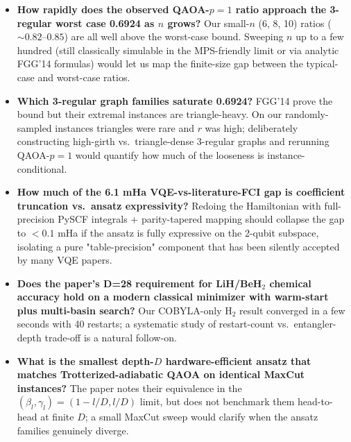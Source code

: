 \documentclass[11pt]{article}
\begin{document}
\begin{itemize}
  \item[\textbf{Q1}] \textbf{How rapidly does the observed QAOA-$p{=}1$ ratio approach the
        3-regular worst case 0.6924 as $n$ grows?}  Our small-$n$ (6, 8, 10)
        ratios ($\sim 0.82$--$0.85$) are all well above the worst-case bound.
        Sweeping $n$ up to a few hundred (still classically simulable in the
        MPS-friendly limit or via analytic FGG'14 formulas) would let us map
        the finite-size gap between the typical-case and worst-case ratios.
  \item[\textbf{Q2}] \textbf{Which 3-regular graph families saturate 0.6924?} FGG'14 prove the
        bound but their extremal instances are triangle-heavy.  On our
        randomly-sampled instances triangles were rare and $r$ was high;
        deliberately constructing high-girth vs.\ triangle-dense 3-regular
        graphs and rerunning QAOA-$p{=}1$ would quantify how much of the
        looseness is instance-conditional.
  \item[\textbf{Q3}] \textbf{How much of the 6.1 mHa VQE-vs-literature-FCI gap is coefficient
        truncation vs.\ ansatz expressivity?} Redoing the Hamiltonian with
        full-precision PySCF integrals + parity-tapered mapping should collapse
        the gap to $< 0.1$ mHa if the ansatz is fully expressive on
        the 2-qubit subspace, isolating a pure "table-precision" component
        that has been silently accepted by many VQE papers.
  \item[\textbf{Q4}] \textbf{Does the paper's D=28 requirement for LiH/BeH$_2$ chemical
        accuracy hold on a modern classical minimizer with warm-start plus
        multi-basin search?} Our COBYLA-only H$_2$ result converged in a few
        seconds with 40 restarts; a systematic study of restart-count vs.\
        entangler-depth trade-off is a natural follow-on.
  \item[\textbf{Q5}] \textbf{What is the smallest depth-$D$ hardware-efficient ansatz that
        matches Trotterized-adiabatic QAOA on identical MaxCut instances?}
        The paper notes their equivalence in the $(\beta_l,\gamma_l) = (1-l/D, l/D)$
        limit, but does not benchmark them head-to-head at finite $D$; a small
        MaxCut sweep would clarify when the ansatz families genuinely diverge.
\end{itemize}
\end{document}
